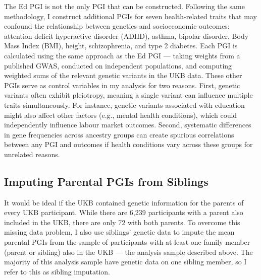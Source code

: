The Ed PGI is not the only PGI that can be constructed.
Following the same methodology, I construct additional PGIs for seven health-related traits that may confound the relationship between genetics and socioeconomic outcomes: attention deficit hyperactive disorder (ADHD), asthma, bipolar disorder, Body Mass Index (BMI), height, schizophrenia, and type 2 diabetes.
Each PGI is calculated using the same approach as the Ed PGI --- taking weights from a published GWAS, conducted on independent populations, and computing weighted sums of the relevant genetic variants in the UKB data.
These other PGIs serve as control variables in my analysis for two reasons.
First, genetic variants often exhibit pleiotropy, meaning a single variant can influence multiple traits simultaneously.
For instance, genetic variants associated with education might also affect other factors (e.g., mental health conditions), which could independently influence labour market outcomes.
Second, systematic differences in gene frequencies across ancestry groups can create spurious correlations between any PGI and outcomes if health conditions vary across these groups for unrelated reasons.

\subsection{Imputing Parental PGIs from Siblings}
\label{sec:pgi-impute}
It would be ideal if the UKB contained genetic information for the parents of every UKB participant.
While there are 6,239 participants with a parent also included in the UKB, there are only 72 with both parents.
To overcome this missing data problem, I also use siblings' genetic data to impute the mean parental PGIs from the sample of  participants with at least one family member (parent or sibling) also in the UKB --- the analysis sample described above.
The majority of this analysis sample have genetic data on one sibling member, so I refer to this as sibling imputation.

